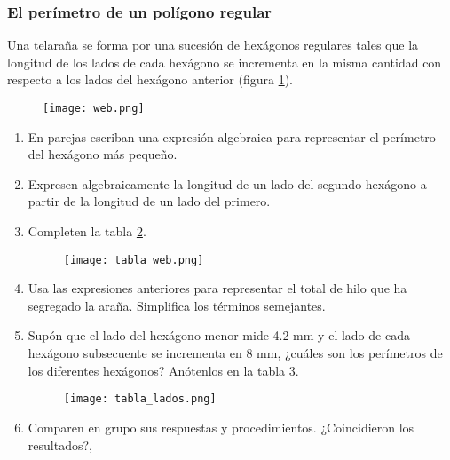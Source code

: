 \begin{enumerate}
          \subsubsection{El perímetro de un polígono regular}
          Una telaraña se forma por una sucesión de hexágonos regulares tales que la longitud de los
          lados de cada hexágono se incrementa en la misma cantidad con respecto a los lados del
          hexágono anterior (figura \ref{fig:web}).
          \begin{figure}[H]
              \centering
              \texttt{[image: web.png]}
              \label{fig:web}
          \end{figure}
          \begin{enumerate}
              \item En parejas escriban una expresión algebraica para representar
                    el perímetro del hexágono más pequeño.
              \item Expresen algebraicamente la longitud de un lado del segundo
                    hexágono a partir de la longitud de un lado del primero.
              \item Completen la tabla \ref{tab:tabla_web}.
                    \begin{figure}[H]
                        \centering
                        \texttt{[image: tabla\_web.png]}
                        \label{tab:tabla_web}
                    \end{figure}
              \item Usa las expresiones anteriores para representar el total de hilo que ha segregado
                    la araña. Simplifica los términos semejantes.
              \item Supón que el lado del hexágono menor mide 4.2 mm y el lado de cada hexágono
                    subsecuente se incrementa en 8 mm, ¿cuáles son los perímetros de los diferentes
                    hexágonos? Anótenlos en la tabla \ref{tab:tabla_lados}.
                    \begin{figure}[H]
                        \centering
                        \texttt{[image: tabla\_lados.png]}
                        \label{tab:tabla_lados}
                    \end{figure}
              \item Comparen en grupo sus respuestas y procedimientos. ¿Coincidieron los resultados?,

\end{enumerate}
\end{enumerate}
